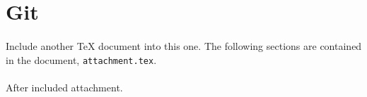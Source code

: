 \documentclass[10pt,a4paper]{article}
\begin{document}
\sectionbreak{}

\section*{Git}

\paragraph{}
Include another TeX document into this one. The following sections are
contained in the document, \texttt{attachment.tex}.



\paragraph{}
After included attachment.
\end{document}
